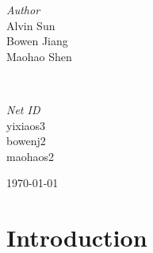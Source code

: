 \documentclass{article}
\begin{document}
\begin{titlepage}
	\begin{minipage}{0.4\textwidth}
		\begin{flushleft}
			\large
			\textit{Author}\\
			Alvin Sun \\ %
            Bowen Jiang  \\
            Maohao Shen
		\end{flushleft}
	\end{minipage}
	~
	\begin{minipage}{0.4\textwidth}
		\begin{flushright}
			\large
			\textit{Net ID}\\
			yixiaos3 \\ %
            bowenj2 \\
            maohaos2
		\end{flushright}
	\end{minipage}



	\vfill\vfill\vfill %

	{\large\today} %




	\vfill %

\end{titlepage}

\section{Introduction}
\end{document}
